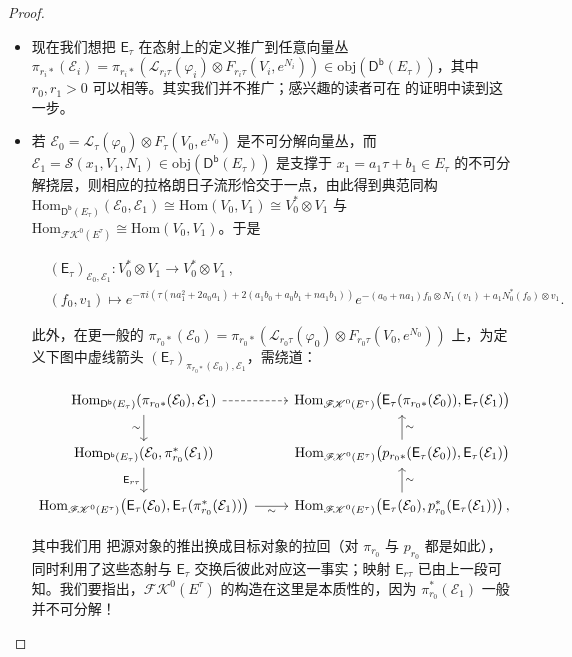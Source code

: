 \begin{proof}
\begin{itemize}[leftmargin=0.5cm]
	\item 现在我们想把 $\mathsf{E}_\tau$ 在态射上的定义推广到任意向量丛 $\pi_{r_i*}(\mathcal{E}_i)=\pi_{r_i*}(\mathcal{L}_{r_i\tau}(\varphi_i)\otimes F_{r_i\tau}(V_i,e^{N_i}))\in\text{obj}(\mathsf{D^b}(E_{\tau}))$，其中 $r_0,r_1>0$ 可以相等。其实我们并不推广；感兴趣的读者可在 \cite[定理 4.1]{[Kre00]} 的证明中读到这一步。
	
	\item 若 $\mathcal{E}_0=\mathcal{L}_\tau(\varphi_0)\otimes F_\tau(V_0,e^{N_0})$ 是不可分解向量丛，而 $\mathcal{E}_1=\mathcal{S}(x_1,V_1,N_1)\in\text{obj}(\mathsf{D^b}(E_\tau))$ 是支撑于 $x_1=a_1\tau+b_1\in E_\tau$ 的不可分解挠层，则相应的拉格朗日子流形恰交于一点，由此得到典范同构 $\text{Hom}_{\mathsf{D^b}(E_\tau)}(\mathcal{E}_0,\mathcal{E}_1)\cong\text{Hom}(V_0,V_1)\cong V_0^*\otimes V_1$ 与 $\text{Hom}_{\mathscr{F\!K}^0(E^\tau)}\cong\text{Hom}(V_0,V_1)$。于是 
	\begin{small}
		\begin{align*}
			&(\mathsf{E}_\tau)_{\mathcal{E}_0,\mathcal{E}_1}:V_0^*\otimes V_1\rightarrow V_0^*\otimes V_1\,, \\
			&(f_0,v_1)\mapsto e^{-\pi i(\tau(na_1^2+2a_0a_1)+2(a_1b_0+a_0b_1+na_1b_1))}e^{-(a_0+na_1)f_0\otimes N_1(v_1)+a_1N_0^*(f_0)\otimes v_1}.
		\end{align*}
	\end{small}
	\!\!此外，在更一般的 $\pi_{r_0*}(\mathcal{E}_0)=\pi_{r_0*}(\mathcal{L}_{r_0\tau}(\varphi_0)\otimes F_{r_0\tau}(V_0,e^{N_0}))$ 上，为定义下图中虚线箭头 $(\mathsf{E}_\tau)_{\pi_{r_0*}(\mathcal{E}_0),\mathcal{E}_1}$，需绕道：
	\begin{small}
		\[
		\begin{tikzcd}
			\text{Hom}_{\mathsf{D^b}(E_\tau)}(\pi_{r_0*}(\mathcal{E}_0),\mathcal{E}_1)\arrow[d, "\sim"']\arrow[r, dashed] &  \text{Hom}_{\mathscr{F\!K}^0(E^\tau)}\big(\mathsf{E}_\tau(\pi_{r_0*}(\mathcal{E}_0)),\mathsf{E}_\tau(\mathcal{E}_1)\big) \\ \text{Hom}_{\mathsf{D^b}(E_\tau)}(\mathcal{E}_0,\pi_{r_0}^*(\mathcal{E}_1))\arrow[d, "\mathsf{E}_{r\tau}"'] & \text{Hom}_{\mathscr{F\!K}^0(E^\tau)}\big(p_{r_0*}(\mathsf{E}_\tau(\mathcal{E}_0)),\mathsf{E}_\tau(\mathcal{E}_1)\big)\arrow[u, "\sim"'] \\ \text{Hom}_{\mathscr{F\!K}^0(E^\tau)}\big(\mathsf{E}_\tau(\mathcal{E}_0),\mathsf{E}_\tau(\pi_{r_0}^*(\mathcal{E}_1))\big)\arrow[r, "\sim"'] & \text{Hom}_{\mathscr{F\!K}^0(E^\tau)}\big(\mathsf{E}_\tau(\mathcal{E}_0),p_{r_0}^*(\mathsf{E}_\tau(\mathcal{E}_1))\big)\,,\arrow[u, "\sim"']		
		\end{tikzcd}
		\]
	\end{small}
	\!\!\!其中我们用 \cite[引理 3.4]{[Kre00]} 把源对象的推出换成目标对象的拉回（对 $\pi_{r_0}$ 与 $p_{r_0}$ 都是如此），同时利用了这些态射与 $\mathsf{E}_\tau$ 交换后彼此对应这一事实；映射 $\mathsf{E}_{r\tau}$ 已由上一段可知。我们要指出，$\mathscr{F\!K}^0(E^\tau)$ 的构造在这里是本质性的，因为 $\pi_{r_0}^*(\mathcal{E}_1)$ 一般并不可分解！
	

\end{itemize}
\end{proof}
